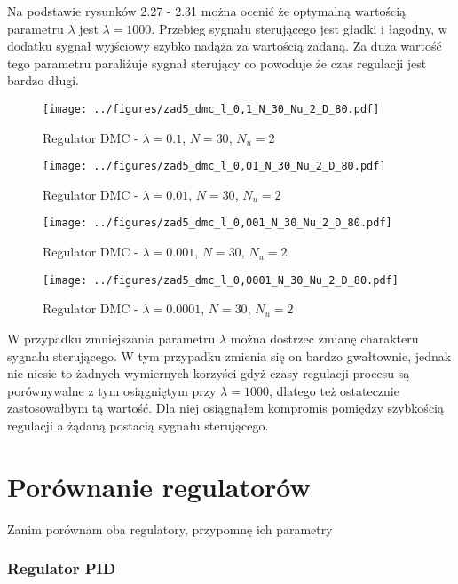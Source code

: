 \documentclass[a4paper,titlepage,11pt,floatssmall]{mwrep}
\begin{document}
Na podstawie rysunków 2.27 - 2.31 można ocenić że optymalną wartością parametru $\lambda$ jest $\lambda = 1000$. Przebieg sygnału sterującego jest gładki i łagodny, w dodatku sygnał wyjściowy szybko nadąża za wartością zadaną. Za duża wartość tego parametru paraliżuje sygnał sterujący co powoduje że czas regulacji jest bardzo długi.

\begin{figure}[H]
\centering
\texttt{[image: ../figures/zad5\_dmc\_l\_0,1\_N\_30\_Nu\_2\_D\_80.pdf]}
\caption{Regulator DMC - $\lambda = 0.1$, $N = 30$, $N_{u} = 2$}
\end{figure}

\begin{figure}[H]
\centering
\texttt{[image: ../figures/zad5\_dmc\_l\_0,01\_N\_30\_Nu\_2\_D\_80.pdf]}
\caption{Regulator DMC - $\lambda = 0.01$, $N = 30$, $N_{u} = 2$}
\end{figure}


\begin{figure}[H]
\centering
\texttt{[image: ../figures/zad5\_dmc\_l\_0,001\_N\_30\_Nu\_2\_D\_80.pdf]}
\caption{Regulator DMC - $\lambda = 0.001$, $N = 30$, $N_{u} = 2$}
\end{figure}


\begin{figure}[H]
\centering
\texttt{[image: ../figures/zad5\_dmc\_l\_0,0001\_N\_30\_Nu\_2\_D\_80.pdf]}
\caption{Regulator DMC - $\lambda = 0.0001$, $N = 30$, $N_{u} = 2$}
\end{figure}
\newpage

W przypadku zmniejszania parametru $\lambda$ można dostrzec zmianę charakteru sygnału sterującego. W tym przypadku zmienia się on bardzo gwałtownie, jednak nie niesie to żadnych wymiernych korzyści gdyż czasy regulacji procesu są porównywalne z tym osiągniętym przy $\lambda = 1000$, dlatego też ostatecznie zastosowałbym tą wartość. Dla niej osiągnąłem kompromis pomiędzy szybkością regulacji a żądaną postacią sygnału sterującego.

\section{Porównanie regulatorów}

Zanim porównam oba regulatory, przypomnę ich parametry

\subsubsection{Regulator PID}
\end{document}
